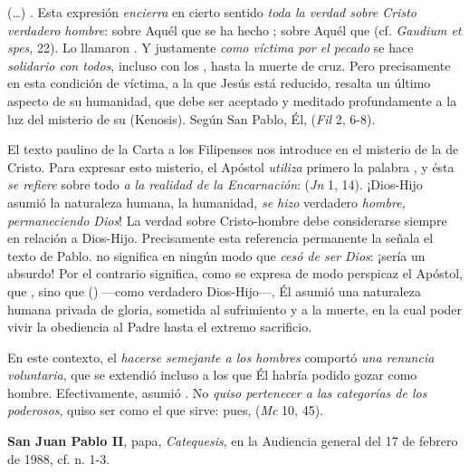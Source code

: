 \begin{patercite}
(\ldots) . Esta expresión \emph{encierra} en cierto sentido \emph{toda la verdad sobre Cristo verdadero hombre}: sobre Aquél que se ha hecho ; sobre Aquél que  (cf. \emph{Gaudium et spes}, 22). Lo llamaron . Y justamente \emph{como víctima por el pecado} se hace \emph{solidario con todos}, incluso con los , hasta la muerte de cruz. Pero precisamente en esta condición de víctima, a la que Jesús está reducido, resalta un último aspecto de su humanidad, que debe ser aceptado y meditado profundamente a la luz del misterio de su  (Kenosis). Según San Pablo, Él,  (\emph{Fil} 2, 6-8).

El texto paulino de la Carta a los Filipenses nos introduce en el misterio de la  de Cristo. Para expresar esto misterio, el Apóstol \emph{utiliza} primero la palabra , y ésta \emph{se refiere} sobre todo \emph{a la realidad de la Encarnación}:  (\emph{Jn} 1, 14). ¡Dios-Hijo asumió la naturaleza humana, la humanidad, \emph{se hizo} verdadero \emph{hombre, permaneciendo Dios}! La verdad sobre Cristo-hombre debe considerarse siempre en relación a Dios-Hijo. Precisamente esta referencia permanente la señala el texto de Pablo.  no significa en ningún modo que \emph{cesó de ser Dios}: ¡sería un absurdo! Por el contrario significa, como se expresa de modo perspicaz el Apóstol, que , sino que  () ---como verdadero Dios-Hijo---, Él asumió una naturaleza humana privada de gloria, sometida al sufrimiento y a la muerte, en la cual poder vivir la obediencia al Padre hasta el extremo sacrificio.

En este contexto, el \emph{hacerse semejante a los hombres} comportó \emph{una renuncia voluntaria}, que se extendió incluso a los  que Él habría podido gozar como hombre. Efectivamente, asumió . No \emph{quiso pertenecer a las categorías de los poderosos}, quiso ser como el que sirve: pues,  (\emph{Mc} 10, 45).

\textbf{San Juan Pablo II}, papa, \textit{Catequesis}, en la Audiencia general del 17 de febrero de 1988, cf. n. 1-3.
\end{patercite}

